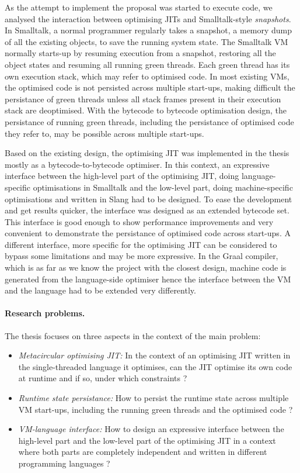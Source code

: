\documentclass[a4paper,12pt,twoside]{../includes/ThesisStyle}
\begin{document}
As the attempt to implement the proposal was started to execute code, we analysed the interaction between optimising JITs and Smalltalk-style \emph{snapshots}. In Smalltalk, a normal programmer regularly takes a snapshot, a memory dump of all the existing objects, to save the running system state. The Smalltalk VM normally starts-up by resuming execution from a snapshot, restoring all the object states and resuming all running green threads. Each green thread has its own execution stack, which may refer to optimised code. In most existing VMs, the optimised code is not persisted across multiple start-ups, making difficult the persistance of green threads unless all stack frames present in their execution stack are deoptimised. With the bytecode to bytecode optimisation design, the persistance of running green threads, including the persistance of optimised code they refer to, may be possible across multiple start-ups.

Based on the existing design, the optimising JIT was implemented in the thesis mostly as a bytecode-to-bytecode optimiser. In this context, an expressive interface between the high-level part of the optimising JIT, doing language-specific optimisations in Smalltalk and the low-level part, doing machine-specific optimisations and written in Slang had to be designed. To ease the development and get results quicker, the interface was designed as an extended bytecode set. This interface is good enough to show performance improvements and very convenient to demonstrate the persistance of optimised code across start-ups. A different interface, more specific for the optimising JIT can be considered to bypass some limitations and may be more expressive. In the Graal compiler, which is as far as we know the project with the closest design, machine code is generated from the language-side optimiser hence the interface between the VM and the language had to be extended very differently.

\paragraph{Research problems.}The thesis focuses on three aspects in the context of the main problem:
\begin{itemize}
	\item \emph{Metacircular optimising JIT:} In the context of an optimising JIT written in the single-threaded language it optimises, can the JIT optimise its own code at runtime and if so, under which constraints ?
	\item \emph{Runtime state persistance:} How to persist the runtime state across multiple VM start-ups, including the running green threads and the optimised code ?
	\item \emph{VM-language interface:} How to design an expressive interface between the high-level part and the low-level part of the optimising JIT in a context where both parts are completely independent and written in different programming languages ?
\end{itemize}
\end{document}
